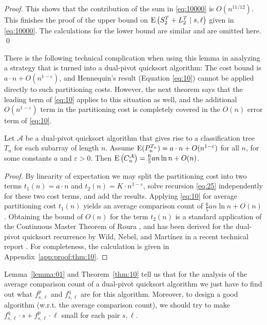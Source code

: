 \documentclass[prodmode,acmtalg]{acmsmall}
\newcommand{\E}{\textnormal{\textrm{E}}}
\begin{document}
\begin{proof}
This shows that the contribution of the sum in \eqref{eq:10000} is $O(n^{11/12})$. This 
finishes the proof of the upper bound on $\E\left(S^T_2+ L^T_2 \mid s, \ell\right)$ given in \eqref{eq:10000}.
The calculations for the lower bound are similar and are omitted here. \qed
\end{proof}
There is the following technical complication when using this lemma in analyzing a strategy 
that is turned into a dual-pivot quicksort algorithm:
The cost bound is $a \cdot n + O(n^{1-\varepsilon})$, and  Hennequin's result (Equation \eqref{eq:10}) cannot be applied directly to such
partitioning costs. 
However, the next theorem says that the leading term of \eqref{eq:10} applies
to this situation as well, and the additional $O(n^{1-\varepsilon})$ term 
in the partitioning cost
is completely covered in the $O(n)$ error term of \eqref{eq:10}.
\begin{theorem}\label{thm:10}
Let $\mathcal{A}$ be a dual-pivot quicksort algorithm that gives rise to
a classification tree $T_n$ for each subarray of length $n$. Assume
$\E(P^{T_n}_n) = a \cdot n + O(n^{1-\varepsilon})$ for all $n$, for some constants $a$ and $\varepsilon > 0$. 
Then $\E\left(C^\mathcal{A}_n\right) = \frac65a n \ln n + O(n)$.
\end{theorem}
\begin{proof}
By linearity of expectation we may split the partitioning cost into two terms $t_1(n) = a \cdot n$ and 
$t_2(n) = K \cdot n^{1-\varepsilon}$, solve recursion \eqref{eq:25} independently for these two
cost terms, and add the results. Applying \eqref{eq:10} for average partitioning cost $t_1(n)$ yields 
an average comparison count of $\frac65 a n \ln n + O(n)$. Obtaining the bound of $O(n)$ for the 
term $t_2(n)$  is a standard application
of the Continuous Master Theorem of Roura \cite{Roura01}, and has been derived for the dual-pivot
quicksort recurrence by Wild, Nebel, and Martínez in a recent technical report
\cite[Appendix D]{WildNM14}. For completeness, 
the calculation is given in Appendix~\ref{app:proof:thm:10}.
\end{proof}
Lemma~\ref{lemma:01} and Theorem~\ref{thm:10} tell us that for the analysis of the 
average comparison count of a dual-pivot quicksort algorithm we just have to find out what 
$f^{\text{p}}_{s,\ell}$ and $f^{\text{q}}_{s,\ell}$ are for
this algorithm. Moreover, to design a good algorithm (w.r.t. the average
comparison count), we should try to make $f^{\text{q}}_{s,\ell} \cdot s + 
f^{\text{p}}_{s,\ell} \cdot
\ell$ small for each pair $s,\ell$. 
\end{document}
